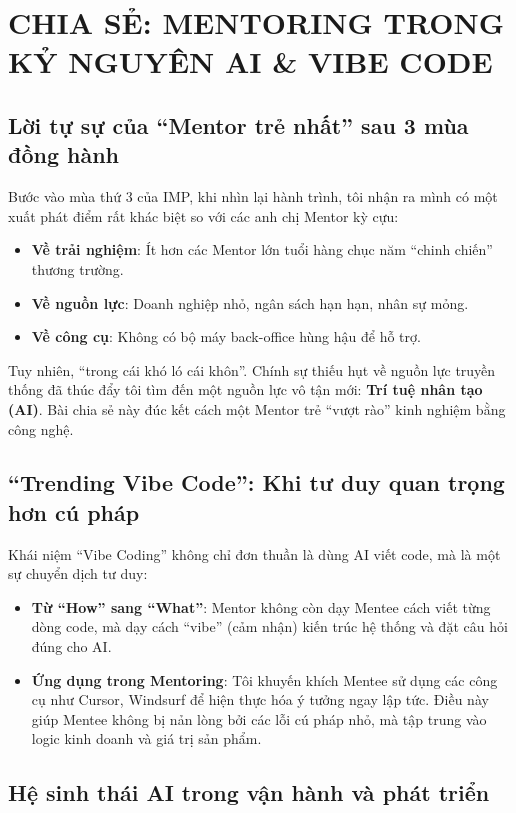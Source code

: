 \chapter{CHIA SẺ: MENTORING TRONG KỶ NGUYÊN AI \& VIBE CODE}

\section{Lời tự sự của ``Mentor trẻ nhất'' sau 3 mùa đồng hành}

Bước vào mùa thứ 3 của IMP, khi nhìn lại hành trình, tôi nhận ra mình có một xuất phát điểm rất khác biệt so với các anh chị Mentor kỳ cựu:
\begin{itemize}
    \item \textbf{Về trải nghiệm}: Ít hơn các Mentor lớn tuổi hàng chục năm ``chinh chiến'' thương trường.
    \item \textbf{Về nguồn lực}: Doanh nghiệp nhỏ, ngân sách hạn hạn, nhân sự mỏng.
    \item \textbf{Về công cụ}: Không có bộ máy back-office hùng hậu để hỗ trợ.
\end{itemize}

Tuy nhiên, ``trong cái khó ló cái khôn''. Chính sự thiếu hụt về nguồn lực truyền thống đã thúc đẩy tôi tìm đến một nguồn lực vô tận mới: \textbf{Trí tuệ nhân tạo (AI)}. Bài chia sẻ này đúc kết cách một Mentor trẻ ``vượt rào'' kinh nghiệm bằng công nghệ.

\section{``Trending Vibe Code'': Khi tư duy quan trọng hơn cú pháp}

Khái niệm ``Vibe Coding'' không chỉ đơn thuần là dùng AI viết code, mà là một sự chuyển dịch tư duy:
\begin{itemize}
    \item \textbf{Từ ``How'' sang ``What''}: Mentor không còn dạy Mentee cách viết từng dòng code, mà dạy cách ``vibe'' (cảm nhận) kiến trúc hệ thống và đặt câu hỏi đúng cho AI.
    \item \textbf{Ứng dụng trong Mentoring}: Tôi khuyến khích Mentee sử dụng các công cụ như Cursor, Windsurf để hiện thực hóa ý tưởng ngay lập tức. Điều này giúp Mentee không bị nản lòng bởi các lỗi cú pháp nhỏ, mà tập trung vào logic kinh doanh và giá trị sản phẩm.
\end{itemize}

\section{Hệ sinh thái AI trong vận hành và phát triển}

